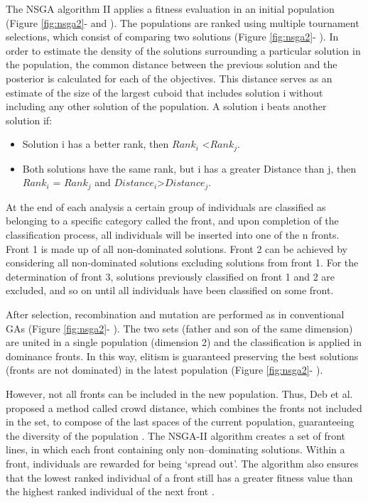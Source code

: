 \documentclass{report}
\begin{document}
The NSGA algorithm II applies a fitness evaluation in an initial population (Figure \ref{fig:nsga2}-  and ). The populations are ranked using multiple tournament selections, which consist of comparing two solutions (Figure \ref{fig:nsga2}- ). In order to estimate the density of the solutions surrounding a particular solution in the population, the common distance between the previous solution and the posterior is calculated for each of the objectives. This distance serves as an estimate of the size of the largest cuboid that includes solution i without including any other solution of the population. A solution i beats another solution if:

\begin{itemize}
\item Solution i has a better rank, then $Rank_i$ <$Rank_j$.
\item Both solutions have the same rank, but i has a greater Distance than j, then $Rank_i$ = $Rank_j$ and $Distance_i$>$Distance_j$.
\end{itemize}

At the end of each analysis a certain group of individuals are classified as belonging to a specific category called the front, and upon completion of the classification process, all individuals will be inserted into one of the n fronts. Front 1 is made up of all non-dominated solutions. Front 2 can be achieved by considering all non-dominated solutions excluding solutions from front 1. For the determination of front 3, solutions previously classified on front 1 and 2 are excluded, and so on until all individuals have been classified on some front.

After selection, recombination and mutation are performed as in conventional GAs (Figure \ref{fig:nsga2}- ). The two sets (father and son of the same dimension) are united in a single population (dimension 2) and the classification is applied in dominance fronts. In this way, elitism is guaranteed preserving the best solutions (fronts are not dominated) in the latest population (Figure \ref{fig:nsga2}- ).

However, not all fronts can be included in the new population. Thus, Deb et al. proposed a method called crowd distance, which combines the fronts not included in the set, to compose of the last spaces of the current population, guaranteeing the diversity of the population \cite{Deb2000}. The NSGA-II algorithm creates a set of front lines, in which each front containing only non–dominating solutions. Within a front, individuals are rewarded for being ‘spread out’. The algorithm also ensures that the lowest ranked individual of a front still has a greater fitness value than the highest ranked individual of the next front \cite{Harman2007}.
\end{document}
